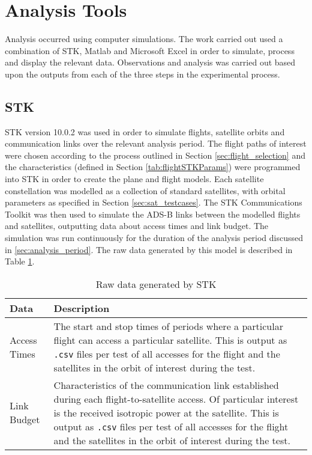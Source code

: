 \section{Analysis Tools}
Analysis occurred using computer simulations. The work carried out used a combination of STK, Matlab and Microsoft Excel in order to simulate, process and display the relevant data. Observations and analysis was carried out based upon the outputs from each of the three steps in the experimental process.
\subsection{STK}
STK version 10.0.2 was used in order to simulate flights, satellite orbits and communication links over the relevant analysis period. The flight paths of interest were chosen according to the process outlined in Section \ref{sec:flight_selection} and the characteristics (defined in Section \ref{tab:flightSTKParams}) were programmed into STK in order to create the plane and flight models. Each satellite constellation was modelled as a collection of standard satellites, with orbital parameters as specified in Section \ref{sec:sat_testcases}. The STK Communications Toolkit was then used to simulate the ADS-B links between the modelled flights and satellites, outputting data about access times and link budget. The simulation was run continuously for the duration of the analysis period discussed in \ref{sec:analysis_period}. The raw data generated by this model is described in Table \ref{tab:STKData}.

\begin{table}[htbp]
  \centering
  \caption{Raw data generated by STK}
    \begin{tabular}{lp{10cm}}
    \toprule
    Data & Description \\
    \midrule
    Access Times & The start and stop times of periods where a particular flight can access a particular satellite. This is output as \Verb|.csv| files per test of all accesses for the flight and the satellites in the orbit of interest during the test.  \\
    Link Budget & Characteristics of the communication link established during each flight-to-satellite access. Of particular interest is the received isotropic power at the satellite. This is output as \Verb|.csv| files per test of all accesses for the flight and the satellites in the orbit of interest during the test.  \\
    \bottomrule
    \end{tabular}%
  \label{tab:STKData}%
\end{table}%

